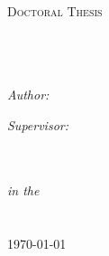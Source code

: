 \documentclass[
10pt, %
english, %
singlespacing, %
]{MastersDoctoralThesis} %
\author{Oriol \textsc{Colomés}} %
\begin{document}
\frontmatter %

\pagestyle{plain} %


\begin{titlepage}
\begin{center}

\textsc{\LARGE \univname}\\[1.5cm] %
\textsc{\Large Doctoral Thesis}\\[0.5cm] %

\HRule \\[0.4cm] %
{\huge \bfseries \ttitle}\\[0.4cm] %
\HRule \\[1.5cm] %
 
\begin{minipage}{0.4\textwidth}
\begin{flushleft} \large
\emph{Author:}\\
{\authorname} %
\end{flushleft}
\end{minipage}
\begin{minipage}{0.4\textwidth}
\begin{flushright} \large
\emph{Supervisor:} \\
{\supname} %
\end{flushright}
\end{minipage}\\[3cm]
 
\large \textit{\degreename}\\[0.3cm] %
\textit{in the}\\[0.4cm]
\groupname\\\deptname\\[2cm] %
 
{\large \today}\\[4cm] %
 
\vfill
\end{center}
\end{titlepage}
\end{document}
